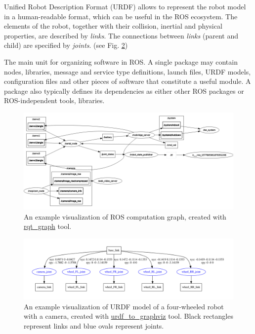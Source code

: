 \documentclass[english,inz,shortabstract]{iithesis}
\begin{document}
\begin{description}[style=nextline]
		\item [URDF model]
		Unified Robot Description Format (URDF) allows to represent the robot model in a human-readable format, which can be useful in the ROS ecosystem. The elements of the robot, together with their collision, inertial and physical properties, are described by \textit{links}. The connections between \textit{links} (parent and child) are specified by \textit{joints}. (see Fig. \ref{fig:husky}) 
		\item [Packages]
		The main unit for organizing software in ROS. A single package may contain nodes, libraries, message and service type definitions, launch files, URDF models, configuration files and other pieces of software that constitute a useful module. A package also typically defines its dependencies as either other ROS packages or ROS-independent tools, libraries.

	\end{description}

	\begin{figure}[ht]
		\centering
		\captionsetup{margin=2cm}
		\includegraphics[width=\textwidth]{img/rqt_graph.png}
		\caption{An example visualization of ROS computation graph, created with  \href{http://wiki.ros.org/rqt_graph}{rqt\_graph} tool.}
		\label{fig:ros_graph}
	\end{figure}

	\begin{figure}[ht]
		\centering
		\captionsetup{margin=1cm}
		\includegraphics[width=\textwidth]{img/leo_description.pdf}
		\caption{An example visualization of URDF model of a four-wheeled robot with a camera, created with \href{http://wiki.ros.org/urdf\#Visualization}{urdf\_to\_graphviz} tool. Black rectangles represent links and blue ovals represent joints.}
		\label{fig:husky}
	\end{figure}
\end{document}
